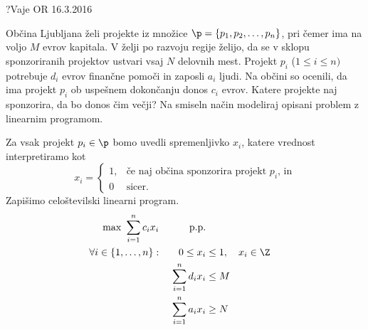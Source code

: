 \begin{naloga}{?}{Vaje OR 16.3.2016}
\begin{vprasanje}
Občina Ljubljana želi projekte iz množice
$\p = \{p_1, p_2, \dots, p_n\}$,
pri čemer ima na voljo $M$ evrov kapitala.
V želji po razvoju regije želijo,
da se v sklopu sponzoriranih projektov ustvari vsaj $N$ delovnih mest.
Projekt $p_i$ ($1 \le i \le n)$ potrebuje $d_i$ evrov finančne pomoči
in zaposli $a_i$ ljudi.
Na občini so ocenili,
da ima projekt $p_i$ ob uspešnem dokončanju donos $c_i$ evrov.
Katere projekte naj sponzorira, da bo donos čim večji?
Na smiseln način modeliraj opisani problem z linearnim programom.
\end{vprasanje}

\begin{odgovor}
Za vsak projekt $p_i \in \p$ bomo uvedli spremenljivko $x_i$,
katere vrednost interpretiramo kot
$$
x_i = \begin{cases}
1, & \text{če naj občina sponzorira projekt $p_i$, in} \\
0  & \text{sicer.}
\end{cases}
$$
Zapišimo celoštevilski linearni program.
\begin{alignat*}{2}
\max \ \sum_{i=1}^n c_i x_i && \text{p.p.} \\
\forall i \in \{1, \dots, n\}: &\ & 0 \le x_i &\le 1, \quad x_i \in \Z \\
&& \sum_{i=1}^n d_i x_i &\le M \\
&& \sum_{i=1}^n a_i x_i &\ge N
\end{alignat*}
\end{odgovor}
\end{naloga}
